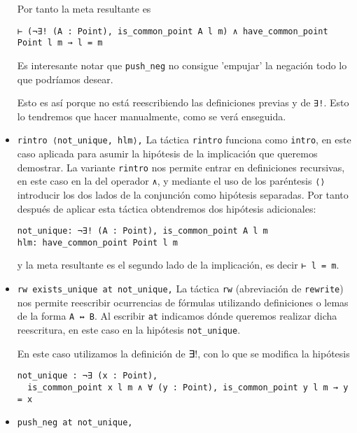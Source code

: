 \begin{itemize}
	      Por tanto la meta resultante es
	      \begin{lstlisting}
⊢ (¬∃! (A : Point), is_common_point A l m) ∧ have_common_point Point l m → l = m
      \end{lstlisting}
	      Es interesante notar que \lstinline{push_neg} no consigue 'empujar' la negación todo lo que podríamos desear.

	      Esto es así porque no está reescribiendo las definiciones previas y de
	      \lstinline{∃!}. Esto lo tendremos que hacer manualmente, como se verá
	      enseguida.

	\item \lstinline{rintro ⟨not_unique, hlm⟩,} La táctica \lstinline{rintro}
	      funciona como \lstinline{intro}, en este caso aplicada para asumir la
	      hipótesis de la implicación que queremos demostrar. La variante
	      \lstinline{rintro} nos permite entrar en definiciones recursivas, en este
	      caso en la del operador \lstinline{∧}, y mediante el uso de los paréntesis
	      \lstinline{⟨⟩} introducir los dos lados de la conjunción como hipótesis
	      separadas. Por tanto después de aplicar esta táctica obtendremos dos
	      hipótesis adicionales:
	      \begin{lstlisting}
not_unique: ¬∃! (A : Point), is_common_point A l m
hlm: have_common_point Point l m
\end{lstlisting}
	      y la meta resultante es el segundo lado de la implicación, es decir
	      \lstinline{⊢ l = m}.

	\item \lstinline{rw exists_unique at not_unique,}  La táctica \lstinline{rw}
	      (abreviación de \lstinline{rewrite}) nos permite reescribir ocurrencias de
	      fórmulas utilizando definiciones o lemas de la forma \lstinline{A ↔ B}. Al
	      escribir \lstinline{at} indicamos dónde queremos realizar dicha
	      reescritura, en este caso en la hipótesis \lstinline{not_unique}.

	      En este caso utilizamos la definición de ∃!, con lo que se modifica la hipótesis
	      \begin{lstlisting}
not_unique : ¬∃ (x : Point), 
  is_common_point x l m ∧ ∀ (y : Point), is_common_point y l m → y = x
      \end{lstlisting}

	\item \lstinline{push_neg at not_unique,}


\end{itemize}
